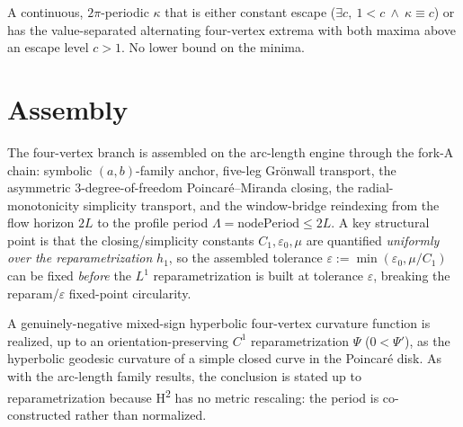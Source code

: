 \begin{definition}
  \label{def:mixed_hyperbolic_four_vertex}
  \leanok
  A continuous, $2\pi$-periodic $\kappa$ that is either constant escape
  ($\exists c,\ 1<c\ \wedge\ \kappa\equiv c$) or has the value-separated
  alternating four-vertex extrema with both maxima above an escape level $c>1$.
  No lower bound on the minima.
\end{definition}

\section{Assembly}

The four-vertex branch is assembled on the arc-length engine through the fork-A
chain: symbolic $(a,b)$-family anchor, five-leg Gr\"onwall transport, the
asymmetric $3$-degree-of-freedom Poincar\'e--Miranda closing, the
radial-monotonicity simplicity transport, and the window-bridge reindexing from
the flow horizon $2L$ to the profile period $\Lambda=\mathrm{nodePeriod}\le 2L$.
A key structural point is that the closing/simplicity constants
$C_1,\varepsilon_0,\mu$ are quantified \emph{uniformly over the reparametrization}
$h_1$, so the assembled tolerance $\varepsilon:=\min(\varepsilon_0,\mu/C_1)$ can
be fixed \emph{before} the $L^1$ reparametrization is built at tolerance
$\varepsilon$, breaking the reparam/$\varepsilon$ fixed-point circularity.

\begin{theorem}
  \label{thm:hyperbolic_mixed_converse}
  \leanok
  A genuinely-negative mixed-sign hyperbolic four-vertex curvature function is
  realized, up to an orientation-preserving $C^1$ reparametrization $\Psi$
  ($0<\Psi'$), as the hyperbolic geodesic curvature of a simple closed curve in
  the Poincar\'e disk. As with the arc-length family results, the conclusion is
  stated up to reparametrization because H\textsuperscript{2} has no metric
  rescaling: the period is co-constructed rather than normalized.
\end{theorem}
